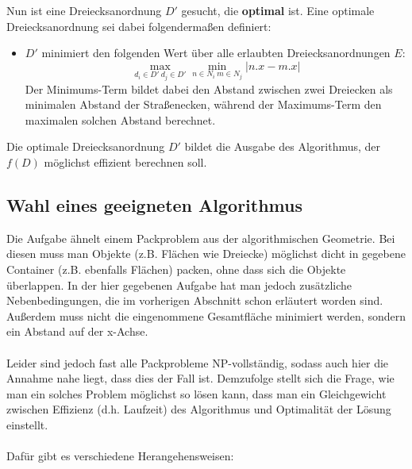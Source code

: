 \documentclass[a4paper, notitlepage, 12pt]{scrartcl}
\begin{document}
Nun ist eine Dreiecksanordnung $D'$ gesucht, die \textbf{optimal} ist. Eine optimale Dreiecksanordnung sei dabei folgendermaßen definiert:
\begin{itemize}
	\item $D'$ minimiert den folgenden Wert über alle erlaubten Dreiecksanordnungen $E$:
	\begin{equation}
	\max_{d_i \in D' ~ d_j \in D'} \min_{n \in N_i ~ m \in N_j} | n.x - m.x |
	\end{equation}
	Der Minimums-Term bildet dabei den Abstand zwischen zwei Dreiecken als minimalen Abstand der Straßenecken, während der Maximums-Term den maximalen solchen Abstand berechnet.
\end{itemize}
 Die optimale Dreiecksanordnung $D'$ bildet die Ausgabe des Algorithmus, der $f(D)$ möglichst effizient berechnen soll.
 \subsection{Wahl eines geeigneten Algorithmus}
 Die Aufgabe ähnelt einem Packproblem aus der algorithmischen Geometrie. Bei diesen muss man Objekte (z.B. Flächen wie Dreiecke) möglichst dicht in gegebene Container (z.B. ebenfalls Flächen) packen, ohne dass sich die Objekte überlappen.\cite{Src:pack} In der hier gegebenen Aufgabe hat man jedoch zusätzliche Nebenbedingungen, die im vorherigen Abschnitt schon erläutert worden sind. Außerdem muss nicht die eingenommene Gesamtfläche minimiert werden, sondern ein Abstand auf der x-Achse. \\ \\
 Leider sind jedoch fast alle Packprobleme NP-vollständig, sodass auch hier die Annahme nahe liegt, dass dies der Fall ist. Demzufolge stellt sich die Frage, wie man ein solches Problem möglichst so lösen kann, dass man ein Gleichgewicht zwischen Effizienz (d.h. Laufzeit) des Algorithmus und Optimalität der Lösung einstellt. \\ \\
 Dafür gibt es verschiedene Herangehensweisen:
\end{document}
